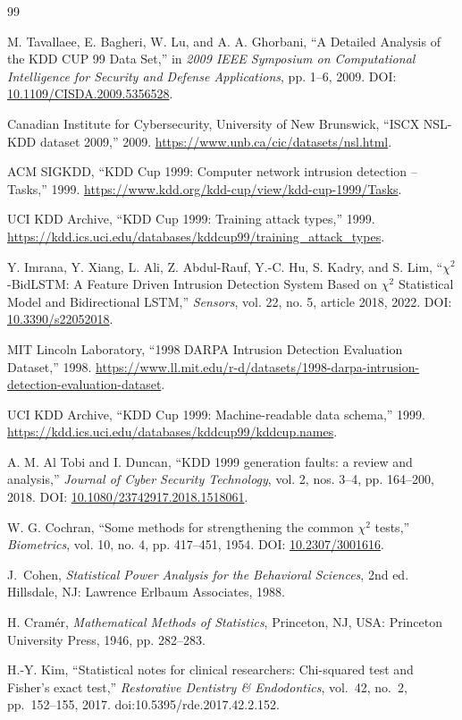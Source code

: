 \begin{thebibliography}{99}

  M. Tavallaee, E. Bagheri, W. Lu, and A. A. Ghorbani,
  ``A Detailed Analysis of the KDD CUP 99 Data Set,''
  in \emph{2009 IEEE Symposium on Computational Intelligence for Security and Defense Applications},
  pp. 1--6, 2009. DOI: \href{https://doi.org/10.1109/CISDA.2009.5356528}{10.1109/CISDA.2009.5356528}.

  Canadian Institute for Cybersecurity, University of New Brunswick,
  ``ISCX NSL-KDD dataset 2009,'' 2009.
  \url{https://www.unb.ca/cic/datasets/nsl.html}.

  ACM SIGKDD,
  ``KDD Cup 1999: Computer network intrusion detection -- Tasks,'' 1999.
  \url{https://www.kdd.org/kdd-cup/view/kdd-cup-1999/Tasks}.

  UCI KDD Archive,
  ``KDD Cup 1999: Training attack types,'' 1999.
  \url{https://kdd.ics.uci.edu/databases/kddcup99/training_attack_types}.

  Y. Imrana, Y. Xiang, L. Ali, Z. Abdul-Rauf, Y.-C. Hu, S. Kadry, and S. Lim,
  ``$\chi^2$-BidLSTM: A Feature Driven Intrusion Detection System Based on $\chi^2$ Statistical Model and Bidirectional LSTM,''
  \emph{Sensors}, vol. 22, no. 5, article 2018, 2022.
  DOI: \href{https://doi.org/10.3390/s22052018}{10.3390/s22052018}.

  MIT Lincoln Laboratory,
  ``1998 DARPA Intrusion Detection Evaluation Dataset,'' 1998.
  \url{https://www.ll.mit.edu/r-d/datasets/1998-darpa-intrusion-detection-evaluation-dataset}.

  UCI KDD Archive,
  ``KDD Cup 1999: Machine-readable data schema,'' 1999.
  \url{https://kdd.ics.uci.edu/databases/kddcup99/kddcup.names}.

  A. M. Al Tobi and I. Duncan,
  ``KDD 1999 generation faults: a review and analysis,''
  \emph{Journal of Cyber Security Technology}, vol. 2, nos. 3--4, pp. 164--200, 2018.
  DOI: \href{https://doi.org/10.1080/23742917.2018.1518061}{10.1080/23742917.2018.1518061}.

  W. G. Cochran,
  ``Some methods for strengthening the common $\chi^2$ tests,''
  \emph{Biometrics}, vol. 10, no. 4, pp. 417--451, 1954.
  DOI: \href{https://doi.org/10.2307/3001616}{10.2307/3001616}.

  J.~Cohen, \textit{Statistical Power Analysis for the Behavioral Sciences}, 2nd ed.
  Hillsdale, NJ: Lawrence Erlbaum Associates, 1988.

  H. Cramér,
  \emph{Mathematical Methods of Statistics},
  Princeton, NJ, USA: Princeton University Press, 1946, pp. 282--283.

  H.-Y. Kim, ``Statistical notes for clinical researchers: Chi-squared test and Fisher's exact test,''
  \textit{Restorative Dentistry \& Endodontics}, vol.~42, no.~2, pp.~152--155, 2017.
  doi:10.5395/rde.2017.42.2.152.

\end{thebibliography}
